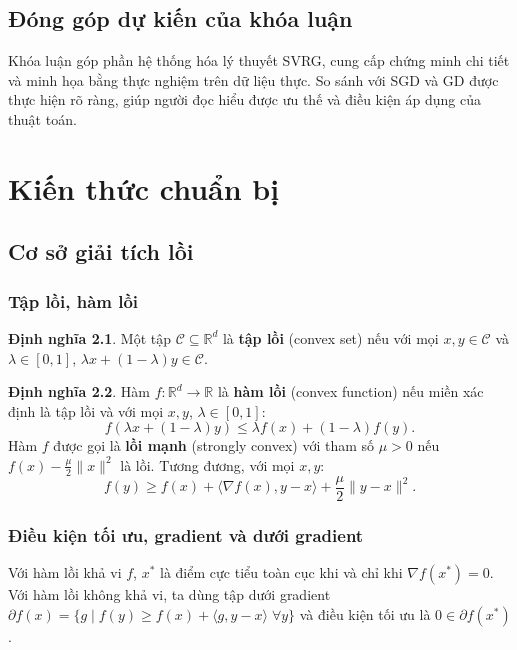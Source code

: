 \documentclass[12pt,a4paper]{report}
\theoremstyle{definition}
\newtheorem{definition}{Định nghĩa}[chapter]
\begin{document}
\section{Đóng góp dự kiến của khóa luận}
Khóa luận góp phần hệ thống hóa lý thuyết SVRG, cung cấp chứng minh chi tiết và minh họa bằng thực nghiệm trên dữ liệu thực. So sánh với SGD và GD được thực hiện rõ ràng, giúp người đọc hiểu được ưu thế và điều kiện áp dụng của thuật toán.

\chapter{Kiến thức chuẩn bị}

\section{Cơ sở giải tích lồi}
\subsection{Tập lồi, hàm lồi}
\begin{definition}
Một tập $\mathcal{C} \subseteq \mathbb{R}^d$ là \textbf{tập lồi} (convex set) nếu với mọi $x,y\in \mathcal{C}$ và $\lambda\in[0,1]$, $\lambda x + (1-\lambda)y \in \mathcal{C}$.
\end{definition}
\begin{definition}
Hàm $f:\mathbb{R}^d \to \mathbb{R}$ là \textbf{hàm lồi} (convex function) nếu miền xác định là tập lồi và với mọi $x,y$, $\lambda\in[0,1]$:
\begin{equation}
f(\lambda x + (1-\lambda)y) \le \lambda f(x) + (1-\lambda) f(y).
\end{equation}
Hàm $f$ được gọi là \textbf{lồi mạnh} (strongly convex) với tham số $\mu > 0$ nếu $f(x) - \frac{\mu}{2}\|x\|^2$ là lồi. Tương đương, với mọi $x,y$:
\begin{equation}
f(y) \ge f(x) + \langle \nabla f(x), y-x \rangle + \frac{\mu}{2}\|y-x\|^2.
\end{equation}
\end{definition}

\subsection{Điều kiện tối ưu, gradient và dưới gradient}
Với hàm lồi khả vi $f$, $x^*$ là điểm cực tiểu toàn cục khi và chỉ khi $\nabla f(x^*) = 0$. Với hàm lồi không khả vi, ta dùng tập dưới gradient $\partial f(x) = \{g \mid f(y) \ge f(x) + \langle g, y-x\rangle \;\forall y\}$ và điều kiện tối ưu là $0\in\partial f(x^*)$.
\end{document}
